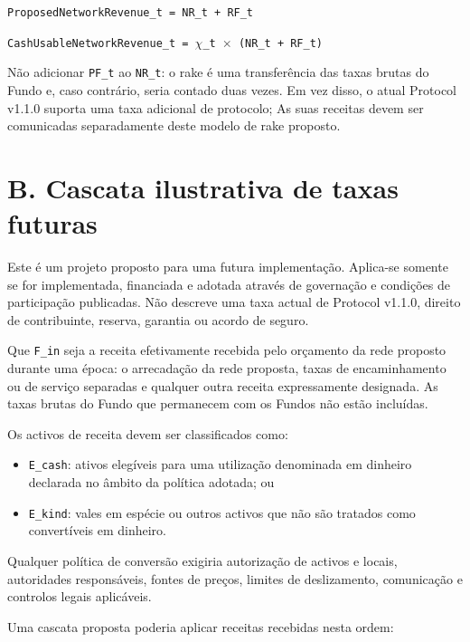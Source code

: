 \documentclass[11pt]{article}
\begin{document}
\texttt{ProposedNetworkRevenue\_t = NR\_t + RF\_t}

\texttt{CashUsableNetworkRevenue\_t = $\chi$\_t $\times$ (NR\_t + RF\_t)}

Não adicionar \texttt{PF\_t} ao \texttt{NR\_t}: o rake é uma transferência das taxas brutas do Fundo e, caso contrário, seria contado duas vezes. Em vez disso, o atual Protocol v1.1.0 suporta uma taxa adicional de protocolo; As suas receitas devem ser comunicadas separadamente deste modelo de rake proposto.


\section*{B. Cascata ilustrativa de taxas futuras}

Este é um projeto proposto para uma futura implementação. Aplica-se somente se for implementada, financiada e adotada através de governação e condições de participação publicadas. Não descreve uma taxa actual de Protocol v1.1.0, direito de contribuinte, reserva, garantia ou acordo de seguro.

Que \texttt{F\_in} seja a receita efetivamente recebida pelo orçamento da rede proposto durante uma época: o arrecadação da rede proposta, taxas de encaminhamento ou de serviço separadas e qualquer outra receita expressamente designada. As taxas brutas do Fundo que permanecem com os Fundos não estão incluídas.

Os activos de receita devem ser classificados como:

\begin{itemize}[leftmargin=*]
\item \texttt{E\_cash}: ativos elegíveis para uma utilização denominada em dinheiro declarada no âmbito da política adotada; ou
\item \texttt{E\_kind}: vales em espécie ou outros activos que não são tratados como convertíveis em dinheiro.
\end{itemize}
Qualquer política de conversão exigiria autorização de activos e locais, autoridades responsáveis, fontes de preços, limites de deslizamento, comunicação e controlos legais aplicáveis.

Uma cascata proposta poderia aplicar receitas recebidas nesta ordem:
\end{document}
